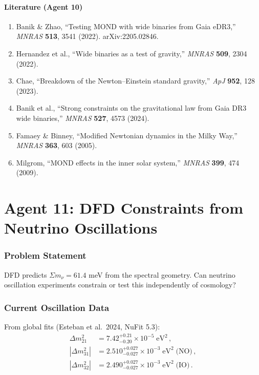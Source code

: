 \documentclass[11pt,a4paper]{article}
\begin{document}
\subsection{Literature (Agent 10)}

\begin{enumerate}
\item Banik \& Zhao, ``Testing MOND with wide binaries from Gaia eDR3,'' \textit{MNRAS} \textbf{513}, 3541 (2022). arXiv:2205.02846.
\item Hernandez et al., ``Wide binaries as a test of gravity,'' \textit{MNRAS} \textbf{509}, 2304 (2022).
\item Chae, ``Breakdown of the Newton--Einstein standard gravity,'' \textit{ApJ} \textbf{952}, 128 (2023).
\item Banik et al., ``Strong constraints on the gravitational law from Gaia DR3 wide binaries,'' \textit{MNRAS} \textbf{527}, 4573 (2024).
\item Famaey \& Binney, ``Modified Newtonian dynamics in the Milky Way,'' \textit{MNRAS} \textbf{363}, 603 (2005).
\item Milgrom, ``MOND effects in the inner solar system,'' \textit{MNRAS} \textbf{399}, 474 (2009).
\end{enumerate}


\part{Agent 11: DFD Constraints from Neutrino Oscillations}
\label{part:neutrino-osc}

\section{Problem Statement}

DFD predicts $\Sigma m_\nu = 61.4$ meV from the spectral geometry. Can neutrino oscillation experiments constrain or test this independently of cosmology?

\section{Current Oscillation Data}

From global fits (Esteban et al.\ 2024, NuFit 5.3):
\begin{align}
\Delta m_{21}^2 &= 7.42^{+0.21}_{-0.20} \times 10^{-5}\;\mathrm{eV}^2\,, \\
|\Delta m_{31}^2| &= 2.510^{+0.027}_{-0.027} \times 10^{-3}\;\mathrm{eV}^2\;\text{(NO)}\,, \\
|\Delta m_{32}^2| &= 2.490^{+0.027}_{-0.027} \times 10^{-3}\;\mathrm{eV}^2\;\text{(IO)}\,.
\end{align}
\end{document}
